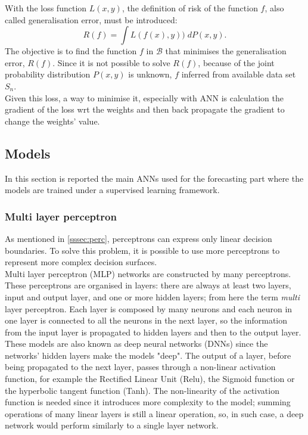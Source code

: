 With the loss function $L(x,y)$, the definition of risk of the function $f$, also called generalisation error, must be introduced:
\[
R(f) = \int L(f(x),y)) \; dP(x,y). 
\]
The objective is to find the function $f$ in $\mathcal{B}$ that minimises the generalisation error, $R(f)$. Since it is not possible to solve $R(f)$, because of the joint probability distribution $P(x,y)$ is unknown, $f$ inferred from available data set $S_n$.\\

Given this loss, a way to minimise it, especially with \gls{ANN} is calculation the gradient of the loss \gls{wrt} the weights and then back propagate the gradient to change the weights' value.

\subsection{Models}
\label{ssec:modelsSL}
In this section is reported the main \glspl{ANN} used for the forecasting part where the models are trained under a supervised learning framework. 

\subsubsection{Multi layer perceptron}
As mentioned in \ref{sssec:perc}, perceptrons can express only linear decision boundaries. To solve this problem, it is possible to use more perceptrons to represent more complex decision surfaces. \\

Multi layer perceptron (\gls{MLP}) networks are constructed by many perceptrons. These perceptrons are organised in layers: there are always at least two layers, input and output layer, and one or more hidden layers; from here the term \emph{multi} layer perceptron. Each layer is composed by many neurons and each neuron in one layer is connected to all the neurons in the next layer, so the information from the input layer is propagated to hidden layers and then to the output layer. These models are also known as deep neural networks (\glspl{DNN}) since the  networks' hidden layers make the models "deep". The output of a layer, before being propagated to the next layer, passes through a non-linear activation function, for example the Rectified Linear Unit (\gls{Relu}), the Sigmoid function or the hyperbolic tangent function (\gls{Tanh}). The non-linearity of the activation function is needed since it introduces more complexity to the model; summing operations of many linear layers is still a linear operation, so, in such case, a deep network would perform similarly to a single layer network.\\

